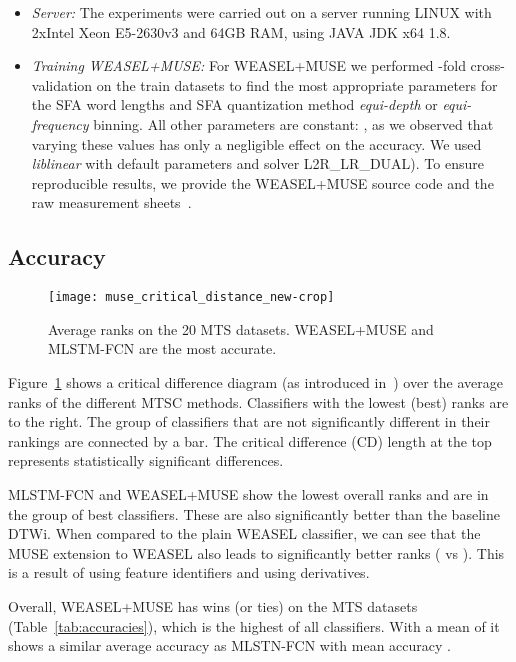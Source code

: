 \documentclass[sigconf]{acmart}
\begin{document}
\begin{itemize}
	\item \emph{Server:} The experiments were carried out on a server running LINUX with 2xIntel Xeon E5-2630v3 and 64GB RAM, using JAVA JDK x64 1.8. 
	\item \emph{Training WEASEL+MUSE:} For WEASEL+MUSE we performed -fold cross-validation on the train datasets to find the most appropriate parameters for the SFA word lengths  and SFA quantization method \emph{equi-depth} or \emph{equi-frequency} binning.  All other parameters are constant: , as we observed that varying these values has only a negligible effect on the accuracy. We used \emph{liblinear} with default parameters  and solver L2R\_LR\_DUAL). To ensure reproducible results, we provide the WEASEL+MUSE source code and the raw measurement sheets~\cite{MUSEWebPage}. 
\end{itemize}

\subsection{Accuracy}

\begin{figure}[t]
	\begin{centering}
		\texttt{[image: muse\_critical\_distance\_new-crop]}
	\end{centering}
	\caption{Average ranks on the 20 MTS datasets. WEASEL+MUSE and MLSTM-FCN are the most accurate.\label{fig:Average-Ranks-on}}
\end{figure}

Figure~\ref{fig:Average-Ranks-on} shows a critical difference diagram (as introduced in~\cite{demvsar2006statistical}) over the average ranks of the different MTSC methods. Classifiers with the lowest (best) ranks are to the right. The group of classifiers that are not significantly different in their rankings are connected by a bar. The critical difference (CD) length at the top represents statistically significant differences. 

MLSTM-FCN and WEASEL+MUSE show the lowest overall ranks and are in the group of best classifiers. These are also significantly better than the baseline DTWi. When compared to the plain WEASEL classifier, we can see that the MUSE extension to WEASEL also leads to significantly better ranks ( vs ). This is a result of using feature identifiers and using derivatives.

Overall, WEASEL+MUSE has  wins (or ties) on the MTS datasets (Table~\ref{tab:accuracies}), which is the  highest of all classifiers. With a mean of  it shows a similar average accuracy as MLSTN-FCN with mean accuracy .
\end{document}
